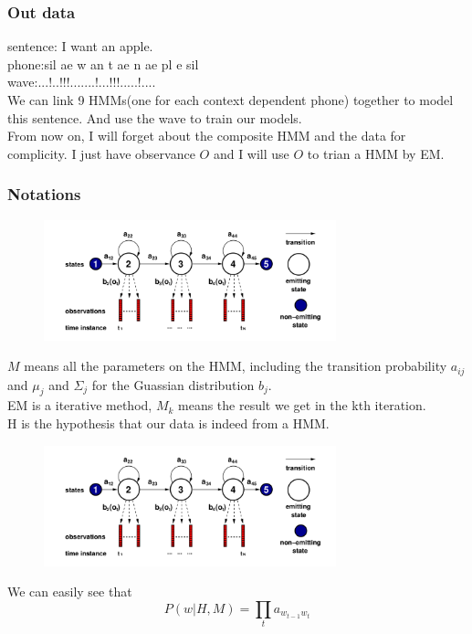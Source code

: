\documentclass{beamer}
\begin{document}
\begin{frame}
\frametitle{Out data}
sentence: I want an apple.\\
phone:sil ae w an t ae n ae pl e sil\\
wave:$...!..!!!.......!...!!!.....!....$\\
We can link 9 HMMs(one for each context dependent phone) together to model this sentence. And use the wave to train our models.\\
From now on, I will forget about the composite HMM and the data for complicity. I just have observance $O$ and I will use $O$ to trian a HMM by EM.
\end{frame}

\begin{frame}
\frametitle{Notations}
\begin{figure}
\includegraphics[width=240pt]{HMM.png}
\end{figure}
$M$ means all the parameters on the HMM, including the transition probability $a_{ij}$ and $\mu_j$ and $\Sigma_j$ for the Guassian distribution $b_j$.\\
EM is a iterative method, $M_k$ means the result we get in the kth iteration.\\
H is the hypothesis that our data is indeed from a HMM.
\end{frame}

\begin{frame}
\begin{figure}
\includegraphics[width=240pt]{HMM.png}
\end{figure}
We can easily see that
\begin{equation}
P(w|H,M)=\prod_{t}a_{w_{t-1}w_t}
\end{equation}
\end{frame}
\end{document}
